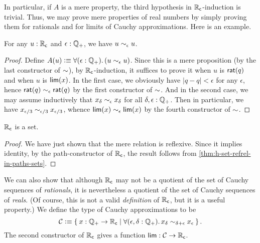 In particular, if $A$ is a mere property, the third hypothesis in $\mathbb{R}_\mathsf{c}$-induction is trivial.
Thus, we may prove mere properties of real numbers by simply proving them for rationals and for limits of Cauchy approximations.
Here is an example.

\begin{lem}
  For any $u:\mathbb{R}_\mathsf{c}$ and $\epsilon:\mathbb{Q}_{+}$, we have $u\sim_{\epsilon} u$.
\end{lem}
\begin{proof}
  Define $A(u) \defeq \fall{\epsilon:\Qp} (u\close\epsilon u)$.
  Since this is a mere proposition (by the last constructor of $\mathord\sim$), by $\mathbb{R}_\mathsf{c}$-induction, it suffices to prove it when $u$ is $\mathsf{rat}(q)$ and when $u$ is $\mathsf{lim}(x)$.
  In the first case, we obviously have $|q-q|<\epsilon$ for any $\epsilon$, hence $\mathsf{rat}(q) \sim_{\epsilon} \mathsf{rat}(q)$ by the first constructor of $\mathord\sim$.
  And in the second case, we may assume inductively that $x_\delta \sim_{\epsilon} x_\delta$ for all $\delta,\epsilon:\mathbb{Q}_{+}$.
  Then in particular, we have $x_{\epsilon/3} \sim_{\epsilon/3} x_{\epsilon/3}$, whence $\mathsf{lim}(x) \sim_{\epsilon} \mathsf{lim}(x)$ by the fourth constructor of $\mathord\sim$.
\end{proof}

\begin{thm}\label{thm:Cauchy-reals-are-a-set}
  $\mathbb{R}_\mathsf{c}$ is a set.
\end{thm}
\begin{proof}
  We have just shown that the mere relation
  is reflexive.
  Since it implies identity, by the path-constructor of $\mathbb{R}_\mathsf{c}$, the result follows from \autoref{thm:h-set-refrel-in-paths-sets}.
\end{proof}

We can also show that although $\mathbb{R}_\mathsf{c}$ may not be a quotient of the set of Cauchy sequences of \emph{rationals}, it is nevertheless a quotient of the set of Cauchy sequences of \emph{reals}.
(Of course, this is not a valid \emph{definition} of $\mathbb{R}_\mathsf{c}$, but it is a useful property.)
We define the type of Cauchy approximations to be
% 
%
%
\begin{equation*}
  \CAP \defeq
  \setof{ x : \Qp \to \RC |
    \fall{\epsilon, \delta : \Qp} x_\delta \close{\delta + \epsilon} x_\epsilon
  }.
\end{equation*}
The second constructor of $\mathbb{R}_\mathsf{c}$ gives a function $\mathsf{lim}:\mathcal{C}\to\mathbb{R}_\mathsf{c}$.

